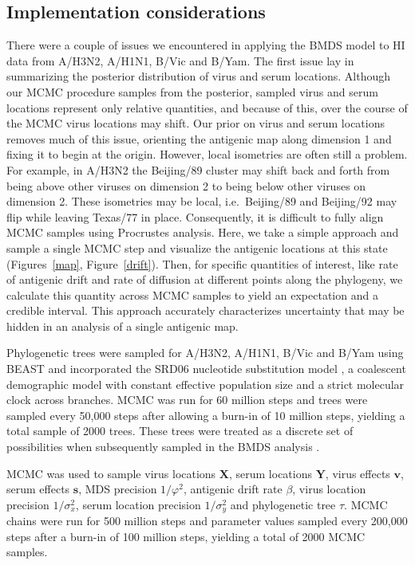 \documentclass[11pt,oneside,letterpaper]{article}
\newcommand{\viruses}{\mathbf{X}}					%
\newcommand{\sera}{\mathbf{Y}}						%
\newcommand{\ves}{\mathbf{v}}						%
\newcommand{\ses}{\mathbf{s}}						%
\newcommand{\mdssd}{\varphi}						%
\newcommand{\virussd}{\sigma_x}						%
\newcommand{\serumsd}{\sigma_y}						%
\newcommand{\tree}{\tau}							%
\begin{document}
\subsection*{Implementation considerations}

There were a couple of issues we encountered in applying the BMDS model to HI data from A/H3N2, A/H1N1, B/Vic and B/Yam.
The first issue lay in summarizing the posterior distribution of virus and serum locations.
Although our MCMC procedure samples from the posterior, sampled virus and serum locations represent only relative quantities, and because of this, over the course of the MCMC virus locations may shift.
Our prior on virus and serum locations removes much of this issue, orienting the antigenic map along dimension 1 and fixing it to begin at the origin.
However, local isometries are often still a problem.
For example, in A/H3N2 the Beijing/89 cluster may shift back and forth from being above other viruses on dimension 2 to being below other viruses on dimension 2.
These isometries may be local, i.e.\ Beijing/89 and Beijing/92 may flip while leaving Texas/77 in place.
Consequently, it is difficult to fully align MCMC samples using Procrustes analysis.
Here, we take a simple approach and sample a single MCMC step and visualize the antigenic locations at this state (Figures~\ref{map}, Figure~\ref{drift}).
Then, for specific quantities of interest, like rate of antigenic drift and rate of diffusion at different points along the phylogeny, we calculate this quantity across MCMC samples to yield an expectation and a credible interval.
This approach accurately characterizes uncertainty that may be hidden in an analysis of a single antigenic map.

Phylogenetic trees were sampled for A/H3N2, A/H1N1, B/Vic and B/Yam using BEAST \cite{BEAST} and incorporated the SRD06 nucleotide substitution model \cite{Shapiro06}, a coalescent demographic model with constant effective population size and a strict molecular clock across branches.
MCMC was run for 60 million steps and trees were sampled every 50,000 steps after allowing a burn-in of 10 million steps, yielding a total sample of 2000 trees.
These trees were treated as a discrete set of possibilities when subsequently sampled in the BMDS analysis \cite{Pagel04}.

MCMC was used to sample virus locations $\viruses$, serum locations $\sera$, virus effects $\ves$, serum effects $\ses$, MDS precision $1/\mdssd^2$, antigenic drift rate $\beta$, virus location precision $1/\virussd^2$, serum location precision $1/\serumsd^2$ and phylogenetic tree $\tree$.
MCMC chains were run for 500 million steps and parameter values sampled every 200,000 steps after a burn-in of 100 million steps, yielding a total of 2000 MCMC samples.
\end{document}
